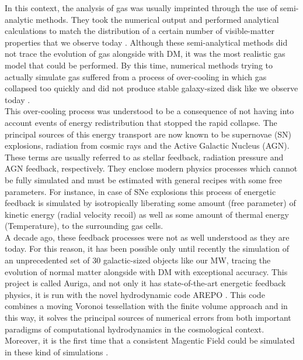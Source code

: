 In this context, the analysis of gas was usually imprinted through the use of semi-analytic methods. They took the numerical output and performed analytical calculations to match the distribution of a certain number of visible-matter properties that we observe today \cite{Lemson_et_al._2006,De_Lucia_et_al._2006}. Although these semi-analytical methods did not trace the evolution of gas alongside with DM, it was the most realistic gas model that could be performed. By this time, numerical methods trying to actually simulate gas suffered from a process of over-cooling in which gas collapsed too quickly and did not produce stable galaxy-sized disk like we observe today \cite{Katz_and_Gunn_1991}.\\

This over-cooling process was understood to be a consequence of not having into account events of energy redistribution that stopped the rapid collapse. The principal sources of this energy transport are now known to be supernovae (SN) explosions, radiation from cosmic rays and the Active Galactic Nucleus (AGN). These terms are usually referred to as stellar feedback, radiation pressure and AGN feedback, respectively. They enclose modern physics processes which cannot be fully simulated and must be estimated with general recipes with some free parameters. For instance, in case of SNe explosions this process of energetic feedback is simulated by isotropically liberating some amount (free parameter) of kinetic energy (radial velocity recoil) as well as some amount of thermal energy (Temperature), to the surrounding gas cells. \\

 A decade ago, these feedback processes were not as well understood as they are today. For this reason, it has been possible only until recently the simulation of an unprecedented set of 30 galactic-sized objects like our MW, tracing the evolution of normal matter alongside with DM with exceptional accuracy. This project is called Auriga, \cite{auriga} and not only it has state-of-the-art energetic feedback physics, it is run with the novel hydrodynamic code AREPO
\cite{arepo}. This code combines a moving Voronoi tessellation with the
finite volume approach and in this way, it solves the principal sources of numerical errors from both important paradigms of computational hydrodynamics in the cosmological context. Moreover, it is the first time that a consistent Magentic Field could be simulated in these kind of simulations \cite{Pakmor_et_al._2017}.\\
 


